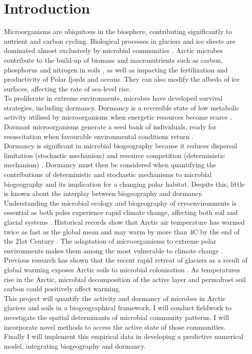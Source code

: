 \chapter{Introduction}

Microorganisms are ubiquitous in the biosphere, contributing significantly to nutrient and carbon cycling. Biological processes in glaciers and ice sheets are dominated almost exclusively by microbial communities \cite{AnesioAm2017Tmog}. Arctic microbes contribute to the build-up of biomass and macronutrients such as carbon, phosphorus and nitrogen in soils \cite{BradleyJamesA2014Mcdi}, as well as impacting the fertilization and productivity of Polar fjords and oceans. They can also modify the albedo of ice surfaces, affecting the rate of sea-level rise. \\

\noindent To proliferate in extreme environments, microbes have developed survival strategies, including dormancy. Dormancy is a reversible state of low metabolic activity utilised by microorganisms when energetic resources become scarce \cite{BradleyJamesA.2019Sotf}. Dormant microorganisms generate a seed bank of individuals, ready for resuscitation when favourable environmental conditions return \cite{JayT.Lennon2011Msbt}. \\

\noindent Dormancy is significant in microbial biogeography because it reduces dispersal limitation (stochastic mechanism) and resource competition (deterministic mechanism) \cite{locey2010synthesizing}. Dormancy must then be considered when quantifying the contributions of deterministic and stochastic mechanisms to microbial biogeography and its implication for a changing polar habitat. Despite this, little is known about the interplay between biogeography and dormancy.\\

\noindent Understanding the microbial ecology and biogeography of cryoenvironments is essential as both poles experience rapid climate change, affecting both soil and glacial systems \cite{SicilianoStevenD2014Sfia}. Historical records show that Arctic air temperature has warmed twice as fast as the global mean and may warm by more than 4\degree C by the end of the 21st Century \cite{stocker2014climate}. The adaptation of microorgamisms to extreme polar environments makes them among the most vulnerable to climate change \cite{WarwickFVincent2010Mert}. \noindent Previous research has shown that the recent rapid retreat of glaciers as a result of global warming exposes Arctic soils to microbial colonisation \cite{10.3389/feart.2017.00026}. As temperatures rise in the Arctic, microbial decomposition of the active layer and permafrost soil carbon could positively affect warming. \\ 

\noindent This project will quantify the activity and dormancy of microbes in Arctic glaciers and soils in a biogeographical framework. I will conduct fieldwork to investigate the spatial determinants of microbial community patterns. I will incorporate novel methods to access the active state of those communities. Finally I will implement this empirical data in developing a predictive numerical model, integrating biogeography and dormancy.\\
